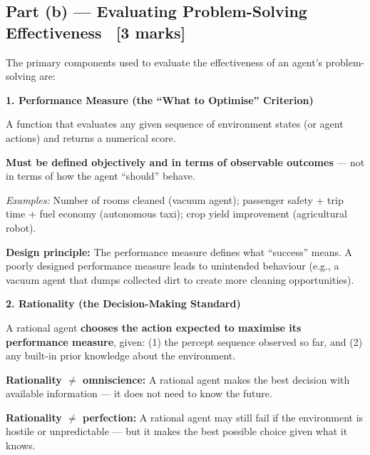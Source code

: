 \documentclass[12pt, a4paper]{article}
\begin{document}
\subsection{Part (b) — Evaluating Problem-Solving Effectiveness \ [3 marks]}

\noindent The primary components used to evaluate the effectiveness of an agent's problem-solving are:

\vspace{0.4em}

\noindent\textbf{1. Performance Measure (the ``What to Optimise'' Criterion)}

\begin{keypoints}
  \item A function that evaluates any given sequence of environment states (or agent actions) and returns a numerical score.
  \item \textbf{Must be defined objectively and in terms of observable outcomes} — not in terms of how the agent ``should'' behave.
  \item \emph{Examples:} Number of rooms cleaned (vacuum agent); passenger safety + trip time + fuel economy (autonomous taxi); crop yield improvement (agricultural robot).
  \item \textbf{Design principle:} The performance measure defines what ``success'' means. A poorly designed performance measure leads to unintended behaviour (e.g., a vacuum agent that dumps collected dirt to create more cleaning opportunities).
\end{keypoints}

\vspace{0.4em}

\noindent\textbf{2. Rationality (the Decision-Making Standard)}

\begin{keypoints}
  \item A rational agent \textbf{chooses the action expected to maximise its performance measure}, given: (1) the percept sequence observed so far, and (2) any built-in prior knowledge about the environment.
  \item \textbf{Rationality $\neq$ omniscience:} A rational agent makes the best decision with available information — it does not need to know the future.
  \item \textbf{Rationality $\neq$ perfection:} A rational agent may still fail if the environment is hostile or unpredictable — but it makes the best possible choice given what it knows.
\end{keypoints}
\end{document}
